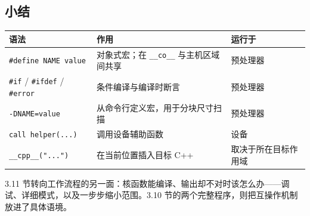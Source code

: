 \subsection*{小结}

\begin{table}[htbp]\centering\small
\begin{tabularx}{\linewidth}{@{}lXX@{}}
\toprule
\textbf{语法} & \textbf{作用} & \textbf{运行于} \\
\midrule
\texttt{\#define NAME value} & 对象式宏；在 \texttt{\_\_co\_\_} 与主机区域间共享 & 预处理器 \\
\texttt{\#if} / \texttt{\#ifdef} / \texttt{\#error} & 条件编译与编译时断言 & 预处理器 \\
\texttt{-DNAME=value} & 从命令行定义宏，用于分块尺寸扫描 & 预处理器 \\
\texttt{call helper(...)} & 调用设备辅助函数 & 设备 \\
\texttt{\_\_cpp\_\_("...")} & 在当前位置插入目标 C++ & 取决于所在目标作用域 \\
\bottomrule
\end{tabularx}
\end{table}

3.11 节转向工作流程的另一面：核函数能编译、输出却不对时该怎么办——调试、详细模式，以及一步步缩小范围。3.10 节的两个完整程序，则把互操作机制放进了具体语境。
